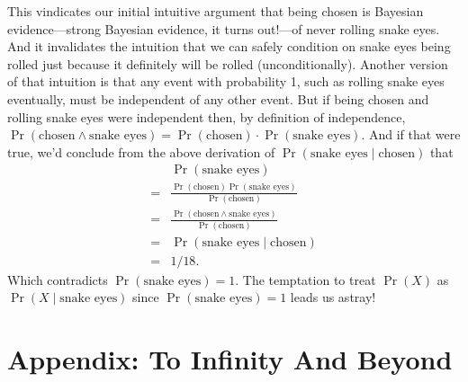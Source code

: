 \documentclass[article,twocolumn]{memoir}
\begin{document}
This vindicates our initial intuitive argument that being chosen is Bayesian evidence---strong Bayesian evidence, it turns out!---of never rolling snake eyes.
And it invalidates the intuition that we can safely condition on snake eyes being rolled just because it definitely will be rolled (unconditionally).
Another version of that intuition is that any event with probability 1, such as rolling snake eyes eventually, must be independent of any other event.
But if being chosen and rolling snake eyes were independent then, by definition of independence,
$\Pr(\text{chosen} \land \text{snake eyes}) = \Pr(\text{chosen})\cdot\Pr(\text{snake eyes})$.
And if that were true, we'd conclude from the above derivation of $\Pr(\text{snake eyes}\mid\text{chosen})$ that
\begin{align*}
   & \Pr(\text{snake eyes})\\
 = & \frac{\Pr(\text{chosen})\Pr(\text{snake eyes})}{\Pr(\text{chosen})}\\
 = & \frac{\Pr(\text{chosen} \land \text{snake eyes})}{\Pr(\text{chosen})}\\
 = & \Pr(\text{snake eyes}\mid\text{chosen})\\
 = & 1/18.
\end{align*}
Which contradicts $\Pr(\text{snake eyes}) = 1$.
The temptation to treat $\Pr(X)$ as $\Pr(X \mid \text{snake eyes})$ since $\Pr(\text{snake eyes}) = 1$ leads us astray!

\appendix


\chapter*{Appendix: To Infinity And Beyond}
\end{document}
